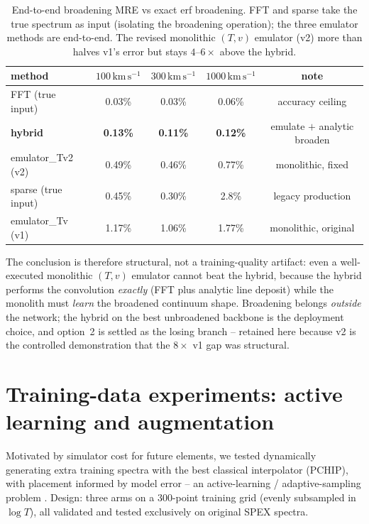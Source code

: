 \documentclass[11pt,a4paper]{article}
\newcommand{\kms}{\,\mathrm{km\,s^{-1}}}
\begin{document}
\begin{table}[ht]
\centering
\begin{tabular}{lcccc}
\toprule
method & $100\kms$ & $300\kms$ & $1000\kms$ & note\\
\midrule
FFT (true input) & 0.03\% & 0.03\% & 0.06\% & accuracy ceiling\\
\textbf{hybrid} & \textbf{0.13\%} & \textbf{0.11\%} & \textbf{0.12\%} &
emulate $+$ analytic broaden\\
emulator\_Tv2 (v2) & 0.49\% & 0.46\% & 0.77\% & monolithic, fixed\\
sparse (true input) & 0.45\% & 0.30\% & 2.8\% & legacy production\\
emulator\_Tv (v1) & 1.17\% & 1.06\% & 1.77\% & monolithic, original\\
\bottomrule
\end{tabular}
\caption{End-to-end broadening MRE vs exact erf broadening. FFT and
sparse take the true spectrum as input (isolating the broadening
operation); the three emulator methods are end-to-end. The revised
monolithic $(T,v)$ emulator (v2) more than halves v1's error but stays
$4$--$6\times$ above the hybrid.}
\label{tab:broad2}
\end{table}

The conclusion is therefore structural, not a training-quality
artifact: even a well-executed monolithic $(T,v)$ emulator cannot beat
the hybrid, because the hybrid performs the convolution \emph{exactly}
(FFT plus analytic line deposit) while the monolith must \emph{learn}
the broadened continuum shape. Broadening belongs \emph{outside} the
network; the hybrid on the best unbroadened backbone is the deployment
choice, and option~2 is settled as the losing branch -- retained here
because v2 is the controlled demonstration that the $8\times$ v1 gap was
structural.

\section{Training-data experiments: active learning and augmentation}
\label{sec:adaptive}

Motivated by simulator cost for future elements, we tested dynamically
generating extra training spectra with the best classical interpolator
(PCHIP), with placement informed by model error -- an active-learning /
adaptive-sampling problem \citep{liu18,wu23,crombecq11,nygaard23,
rogers19}. Design: three arms on a 300-point training grid (evenly
subsampled in $\log T$), all validated and tested exclusively on
original SPEX spectra.
\end{document}
